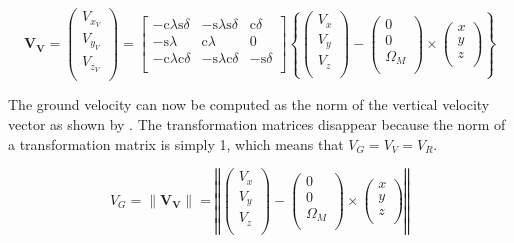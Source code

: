  \begin{equation} \label{eq:VItoVV}
\mathbf{V_{V}} =  
 \begin{pmatrix}
V_{x_{V}}\\
V_{y_{V}}\\
V_{z_{V}}\\
\end{pmatrix}
=
\left[
\begin{matrix}
-\text{c}\lambda \text{s}\delta & -\text{s}\lambda \text{s}\delta & \text{c}\delta\\
-\text{s}\lambda & \text{c}\lambda & 0\\
-\text{c}\lambda \text{c}\delta & -\text{s}\lambda \text{c}\delta & -\text{s}\delta\\
\end{matrix}
\right]
\left\lbrace
\begin{pmatrix}
V_{x}\\
V_{y}\\
V_{z}\\
\end{pmatrix}
-
\begin{pmatrix}
0 \\
0 \\
\Omega_{M} \\
\end{pmatrix}
\times
\begin{pmatrix}
x \\
y \\
z \\
\end{pmatrix}
\right\rbrace
 \end{equation}

\noindent
The ground velocity can now be computed as the norm of the vertical velocity vector as shown by . The transformation matrices disappear because the norm of a transformation matrix is simply 1, which means that $V_{G}=V_{V}=V_{R}$.

\begin{equation} \label{eq:VG}
V_{G} = \| \mathbf{V_{V}} \| = 
\left\Vert
\begin{pmatrix}
V_{x}\\
V_{y}\\
V_{z}\\
\end{pmatrix}
-
\begin{pmatrix}
0 \\
0 \\
\Omega_{M} \\
\end{pmatrix}
\times
\begin{pmatrix}
x \\
y \\
z \\
\end{pmatrix}
\right\Vert 
\end{equation}

